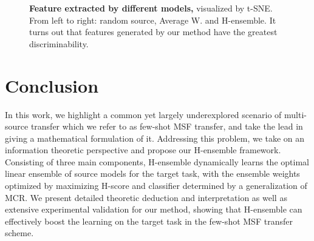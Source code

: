 \documentclass[letterpaper]{article} %
\begin{document}
\begin{figure}[!ht]
    \centering
    \centerline{}
    \caption{\textbf{Feature extracted by different models,} visualized by t-SNE. From left to right: random source, Average W. and H-ensemble. It turns out that features generated by our method have the greatest discriminability.
    }
    \label{fig:tsne}
\end{figure}













\section{Conclusion}



In this work, we highlight a common yet largely underexplored scenario of multi-source transfer which we refer to as few-shot MSF transfer, and take the lead in giving a mathematical formulation of it. Addressing this problem, we take on an information theoretic perspective and propose our H-ensemble framework. Consisting of three main components, H-ensemble dynamically learns the optimal linear ensemble of source models for the target task, with the ensemble weights optimized by maximizing H-score and classifier determined by a generalization of MCR. We present detailed theoretic deduction and interpretation as well as extensive experimental validation for our method, showing that H-ensemble can effectively boost the learning on the target task in the few-shot MSF transfer scheme.
\end{document}
